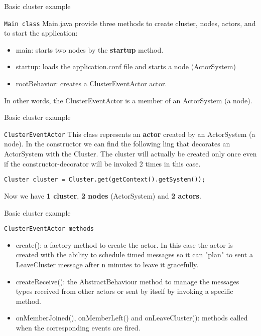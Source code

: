 \documentclass[presentation,apice]{beamer}\mode<presentation>{\usetheme{AMSBolognaFC}}
\begin{document}
\begin{frame}{Basic cluster example}    
\begin{block}{\texttt{Main class}}
Main.java provide three methods to create cluster, nodes, actors, and to start the application: 
\begin{itemize}
    \item main: starts two nodes by the \textbf{startup} method.
    \item startup: loads the application.conf file and starts a node (ActorSystem)
    \item rootBehavior: creates a ClusterEventActor actor.
\end{itemize}
In other words, the ClusterEventActor is a member of an ActorSystem (a node).
\end{block}
%
\end{frame}

\begin{frame}[c,fragile]{Basic cluster example}    

\begin{block}{\texttt{ClusterEventActor}}
This class represents an \textbf{actor} created by an ActorSystem (a node). 
In the constructor we can find the following ling that decorates an ActorSystem with the Cluster.
The cluster will actually be created only once even if the constructor-decorator will be invoked 2 times in this case.
\begin{lstlisting}
Cluster cluster = Cluster.get(getContext().getSystem());
\end{lstlisting}
Now we have \textbf{1 cluster}, \textbf{2 nodes} (ActorSystem) and \textbf{2 actors}.
\end{block}
%
\end{frame}

\begin{frame}[c,fragile]{Basic cluster example}    
\begin{block}{\texttt{ClusterEventActor methods}}
\begin{itemize}
    \item create(): a factory method to create the actor. In this case the actor is created with the ability to schedule timed messages so it can "plan" to sent a LeaveCluster message after n minutes to leave it gracefully. 
    \item createReceive(): the AbstractBehaviour method to manage the messages types received from other actors or sent by itself by invoking a specific method.
    \item onMemberJoined(), onMemberLeft() and onLeaveCluster(): methods called when the corresponding events are fired.
\end{itemize}
\end{block}
%
\end{frame}
\end{document}
